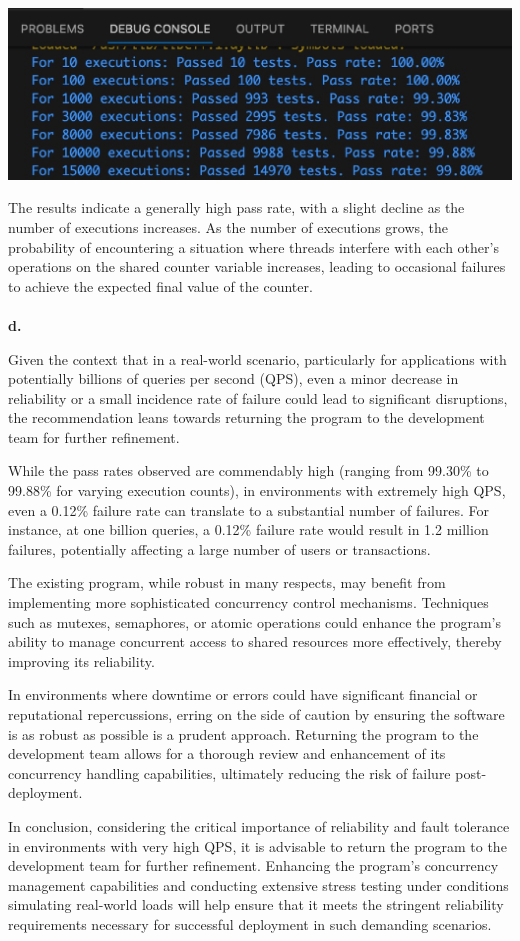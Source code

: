 \documentclass[12pt]{article}
\numberwithin{table}{section}
\begin{document}
	\begin{center}
		\includegraphics[width=1\textwidth]{image/4.eps}
	\end{center}

	The results indicate a generally high pass rate, with a slight decline as the number of executions increases. As the number of executions grows, the probability of encountering a situation where threads interfere with each other's operations on the shared counter variable increases, leading to occasional failures to achieve the expected final value of the counter.\\
	\\
	\textbf{d.}
	
	Given the context that in a real-world scenario, particularly for applications with potentially billions of queries per second (QPS), even a minor decrease in reliability or a small incidence rate of failure could lead to significant disruptions, the recommendation leans towards returning the program to the development team for further refinement. 
	
	While the pass rates observed are commendably high (ranging from 99.30\% to 99.88\% for varying execution counts), in environments with extremely high QPS, even a 0.12\% failure rate can translate to a substantial number of failures. For instance, at one billion queries, a 0.12\% failure rate would result in 1.2 million failures, potentially affecting a large number of users or transactions.
	
	The existing program, while robust in many respects, may benefit from implementing more sophisticated concurrency control mechanisms. Techniques such as mutexes, semaphores, or atomic operations could enhance the program's ability to manage concurrent access to shared resources more effectively, thereby improving its reliability.
	
	In environments where downtime or errors could have significant financial or reputational repercussions, erring on the side of caution by ensuring the software is as robust as possible is a prudent approach. Returning the program to the development team allows for a thorough review and enhancement of its concurrency handling capabilities, ultimately reducing the risk of failure post-deployment.
	
	In conclusion, considering the critical importance of reliability and fault tolerance in environments with very high QPS, it is advisable to return the program to the development team for further refinement. Enhancing the program's concurrency management capabilities and conducting extensive stress testing under conditions simulating real-world loads will help ensure that it meets the stringent reliability requirements necessary for successful deployment in such demanding scenarios.
\end{document}
